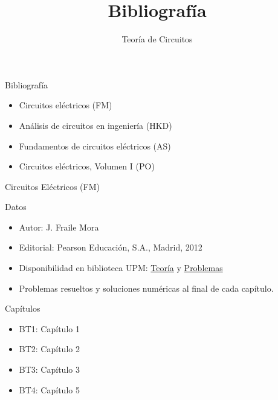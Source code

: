 \documentclass[aspectratio=169, usenames,svgnames,dvipsnames]{beamer}
\date{}
\title{Bibliografía}
\subtitle{Teoría de Circuitos}
\begin{document}
\maketitle


\begin{frame}[label={sec:org0c468d1}]{Bibliografía}
\begin{itemize}
\item Circuitos eléctricos (\alert{FM})
\item Análisis de circuitos en ingeniería (\alert{HKD})
\item Fundamentos de circuitos eléctricos (\alert{AS})
\item Circuitos eléctricos, Volumen I (\alert{PO})
\end{itemize}
\end{frame}


\begin{frame}[label={sec:orgd7caf70}]{Circuitos Eléctricos (\alert{FM})}
\begin{block}{Datos}
\begin{itemize}
\item Autor: J. Fraile Mora
\item Editorial: Pearson Educación, S.A., Madrid, 2012
\item Disponibilidad en biblioteca UPM: \href{https://ingenio.upm.es/primo-explore/fulldisplay?docid=34UPM\_ALMA2150534070004212\&context=L\&vid=34UPM\_VU1\&search\_scope=TAB1\_SCOPE1\&tab=tab1\&lang=es\_ES}{Teoría} y \href{https://ingenio.upm.es/permalink/f/1vo0cl5/34UPM\_ALMA2164586310004212}{Problemas}
\item Problemas resueltos y soluciones numéricas al final de cada capítulo.
\end{itemize}
\end{block}

\begin{block}{Capítulos}
\begin{itemize}
\item BT1: Capítulo 1
\item BT2: Capítulo 2
\item BT3: Capítulo 3
\item BT4: Capítulo 5
\end{itemize}
\end{block}
\end{frame}
\end{document}
